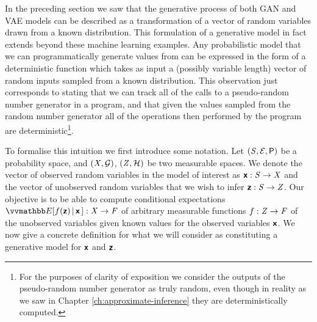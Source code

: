 In the preceding section we saw that the generative process of both \ac{GAN} and \ac{VAE} models can be described as a transformation of a vector of random variables drawn from a known distribution. This formulation of a generative model in fact extends beyond these machine learning examples. Any probabilistic model that we can programmatically generate values from can be expressed in the form of a deterministic function which takes as input a (possibly variable length) vector of random inputs sampled from a known distribution. This observation just corresponds to stating that we can track all of the calls to a pseudo-random number generator in a program, and that given the values sampled from the random number generator all of the operations then performed by the program are deterministic\footnote{For the purposes of clarity of exposition we consider the outputs of the pseudo-random number generator as truly random, even though in reality as we saw in Chapter \ref{ch:approximate-inference} they are deterministically computed.}.

To formalise this intuition we first introduce some notation. Let $(\mathit{S}, \mathcal{E}, \mathsf{P})$ be a probability space, and $(\mathit{X}, \mathcal{G})$, $(\mathit{Z}, \mathcal{H})$ be two measurable spaces. We denote the vector of observed random variables in the model of interest as $\boldsymbol{\mathsf{x}} : \mathit{S} \to \mathit{X}$ and the vector of unobserved random variables that we wish to infer $\boldsymbol{\mathsf{z}} : \mathit{S} \to \mathit{Z}$. Our objective is to be able to compute conditional expectations $\expc{f(\rvct{z}) \gvn \rvct{x}\,} : \set{X} \to \set{F}$ of arbitrary measurable functions $f : \mathit{Z} \to \mathit{F}$ of the unobserved variables given known values for the observed variables $\boldsymbol{\mathsf{x}}$. %
We now give a concrete definition for what we will consider as constituting a generative model for $\boldsymbol{\mathsf{x}}$ and $\boldsymbol{\mathsf{z}}$.

